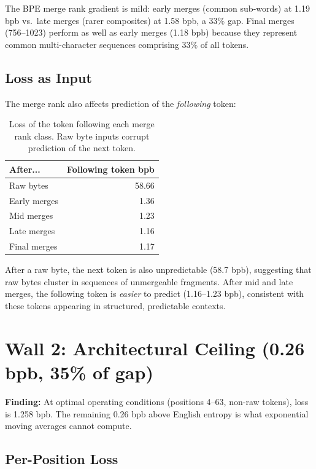 \documentclass[11pt,a4paper]{report}
\newcommand{\finding}[1]{\textcolor{finding}{\textbf{Finding:}} #1}
\begin{document}
The BPE merge rank gradient is mild: early merges (common sub-words) at 1.19 bpb vs.\ late merges (rarer composites) at 1.58 bpb, a 33\% gap. Final merges (756--1023) perform as well as early merges (1.18 bpb) because they represent common multi-character sequences comprising 33\% of all tokens.

\subsection{Loss as Input}

The merge rank also affects prediction of the \emph{following} token:

\begin{table}[h]
\centering
\begin{tabular}{lr}
\toprule
\textbf{After...} & \textbf{Following token bpb} \\
\midrule
Raw bytes & 58.66 \\
Early merges & 1.36 \\
Mid merges & 1.23 \\
Late merges & 1.16 \\
Final merges & 1.17 \\
\bottomrule
\end{tabular}
\caption{Loss of the token following each merge rank class. Raw byte inputs corrupt prediction of the next token.}
\label{tab:following_loss}
\end{table}

After a raw byte, the next token is also unpredictable (58.7 bpb), suggesting that raw bytes cluster in sequences of unmergeable fragments. After mid and late merges, the following token is \emph{easier} to predict (1.16--1.23 bpb), consistent with these tokens appearing in structured, predictable contexts.


\section{Wall 2: Architectural Ceiling (0.26 bpb, 35\% of gap)}

\finding{At optimal operating conditions (positions 4--63, non-raw tokens), loss is 1.258 bpb. The remaining 0.26 bpb above English entropy is what exponential moving averages cannot compute.}

\subsection{Per-Position Loss}
\end{document}
